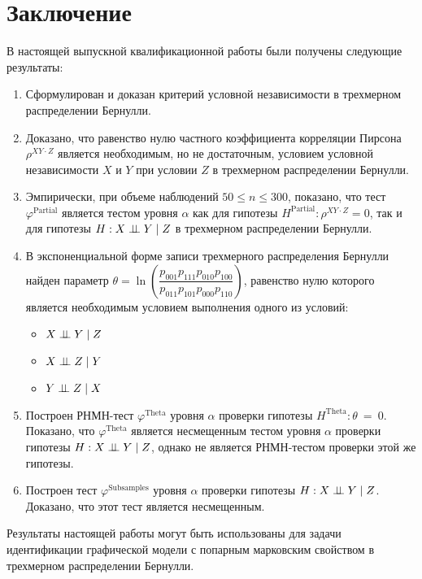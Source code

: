 \section*{Заключение}
В настоящей выпускной квалификационной работы 
были получены следующие результаты:
\begin{enumerate}
    \item Сформулирован и доказан критерий условной независимости
    в трехмерном распределении Бернулли.
    \item Доказано, что равенство нулю частного коэффициента корреляции 
    Пирсона $\rho^{XY \cdot Z}$ является
    необходимым, но не достаточным, условием
    условной независимости $X$ и $Y$ при 
    условии $Z$ в трехмерном распределении Бернулли.
    \item Эмпирически, при объеме наблюдений $50 \leq n \leq 300$,
    показано, что тест
    $\varphi^{\text{Partial}}$ является тестом уровня
    $\alpha$ как для гипотезы $H^{\text{Partial}}: \rho^{XY\cdot Z}=0$,
    так и для гипотезы $H: X \perp\!\!\!\perp Y \mid Z$ в трехмерном распределении
    Бернулли.
    \item В экспоненциальной форме записи трехмерного 
    распределения Бернулли найден параметр 
    $\theta = \ln  \left(\dfrac{p_{001}p_{111}p_{010}p_{100}}{p_{011}p_{101}p_{000}p_{110}}\right)$,
    равенство нулю которого является необходимым условием выполнения одного из условий:
    \begin{itemize}
        \item $X \perp\!\!\!\perp Y \mid Z$
        \item $X \perp\!\!\!\perp Z \mid Y$
        \item $Y \perp\!\!\!\perp Z \mid X$
    \end{itemize}
    \item Построен РНМН-тест $\varphi^{\text{Theta}}$
    уровня $\alpha$ проверки гипотезы $H^{\text{Theta}}: \theta~=~0$.
    Показано, что $\varphi^{\text{Theta}}$ является несмещенным тестом 
    уровня $\alpha$ проверки гипотезы $H: X \perp\!\!\!\perp Y \mid Z$,
    однако не является РНМН-тестом проверки этой же гипотезы.
    \item Построен тест $\varphi^{\text{Subsamples}}$ 
    уровня $\alpha$
    проверки гипотезы $H: X \perp\!\!\!\perp Y \mid Z$. Доказано, что 
    этот тест является несмещенным.
\end{enumerate}
Результаты настоящей работы могут быть использованы для задачи идентификации
графической модели с попарным марковским свойством в трехмерном
распределении Бернулли.
